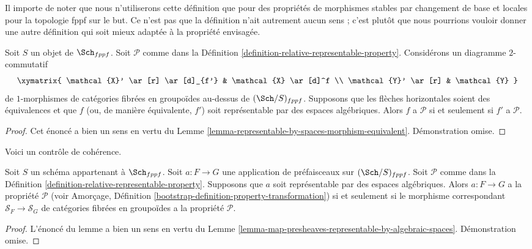\noindent
Il importe de noter que nous n'utiliserons cette définition que pour des
propriétés de morphismes stables par changement de base et
locales pour la topologie fppf sur le but. Ce n'est
pas que la définition n'ait autrement aucun sens ; c'est plutôt
que nous pourrions vouloir donner une autre définition qui soit
mieux adaptée à la propriété envisagée.

\begin{lemma}
\label{lemma-property-morphism-equivalent}
Soit $S$ un objet de $\Sch_{fppf}$.
Soit $\mathcal{P}$ comme dans la
Définition \ref{definition-relative-representable-property}.
Considérons un diagramme $2$-commutatif
$$
\xymatrix{
\mathcal{X}' \ar[r] \ar[d]_{f'} & \mathcal{X} \ar[d]^f \\
\mathcal{Y}' \ar[r] & \mathcal{Y}
}
$$
de $1$-morphismes de catégories fibrées en groupoïdes au-dessus de
$(\Sch/S)_{fppf}$.
Supposons que les flèches horizontales soient des équivalences et que $f$
(ou, de manière équivalente, $f'$) soit représentable par des espaces algébriques.
Alors $f$ a $\mathcal{P}$ si et seulement si $f'$ a $\mathcal{P}$.
\end{lemma}

\begin{proof}
Cet énoncé a bien un sens en vertu du
Lemme \ref{lemma-representable-by-spaces-morphism-equivalent}.
Démonstration omise.
\end{proof}

\noindent
Voici un contrôle de cohérence.

\begin{lemma}
\label{lemma-map-presheaves-representable-by-spaces-transformation-property}
Soit $S$ un schéma appartenant à $\Sch_{fppf}$.
Soit $a : F \to G$ une application de préfaisceaux sur $(\Sch/S)_{fppf}$.
Soit $\mathcal{P}$ comme dans la
Définition \ref{definition-relative-representable-property}.
Supposons que $a$ soit représentable par des espaces algébriques.
Alors $a : F \to G$ a la propriété $\mathcal{P}$ (voir
Amorçage, Définition \ref{bootstrap-definition-property-transformation})
si et seulement si le morphisme correspondant
$\mathcal{S}_F \to \mathcal{S}_G$ de catégories fibrées en groupoïdes
a la propriété $\mathcal{P}$.
\end{lemma}

\begin{proof}
L'énoncé du lemme a bien un sens en vertu du
Lemme \ref{lemma-map-presheaves-representable-by-algebraic-spaces}.
Démonstration omise.
\end{proof}

